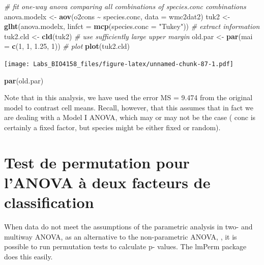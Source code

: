 \documentclass[
  12pt,
]{book}
\newenvironment{Shaded}{\begin{snugshade}}{\end{snugshade}}
\newcommand{\CommentTok}[1]{\textcolor[rgb]{0.56,0.35,0.01}{\textit{#1}}}
\newcommand{\DataTypeTok}[1]{\textcolor[rgb]{0.13,0.29,0.53}{#1}}
\newcommand{\DecValTok}[1]{\textcolor[rgb]{0.00,0.00,0.81}{#1}}
\newcommand{\FloatTok}[1]{\textcolor[rgb]{0.00,0.00,0.81}{#1}}
\newcommand{\KeywordTok}[1]{\textcolor[rgb]{0.13,0.29,0.53}{\textbf{#1}}}
\newcommand{\NormalTok}[1]{#1}
\newcommand{\OperatorTok}[1]{\textcolor[rgb]{0.81,0.36,0.00}{\textbf{#1}}}
\newcommand{\StringTok}[1]{\textcolor[rgb]{0.31,0.60,0.02}{#1}}
\begin{document}
\begin{Shaded}
\begin{Highlighting}[]
\CommentTok{\# fit one{-}way anova comparing all combinations of species.conc combinations}
\NormalTok{anova.modelx \textless{}{-}}\StringTok{ }\KeywordTok{aov}\NormalTok{(o2cons }\OperatorTok{\textasciitilde{}}\StringTok{ }\NormalTok{species.conc, }\DataTypeTok{data =}\NormalTok{ wmc2dat2)}
\NormalTok{tuk2 \textless{}{-}}\StringTok{ }\KeywordTok{glht}\NormalTok{(anova.modelx, }\DataTypeTok{linfct =} \KeywordTok{mcp}\NormalTok{(}\DataTypeTok{species.conc =} \StringTok{"Tukey"}\NormalTok{))}
\CommentTok{\# extract information}
\NormalTok{tuk2.cld \textless{}{-}}\StringTok{ }\KeywordTok{cld}\NormalTok{(tuk2)}
\CommentTok{\# use sufficiently large upper margin}
\NormalTok{old.par \textless{}{-}}\StringTok{ }\KeywordTok{par}\NormalTok{(}\DataTypeTok{mai =} \KeywordTok{c}\NormalTok{(}\DecValTok{1}\NormalTok{, }\DecValTok{1}\NormalTok{, }\FloatTok{1.25}\NormalTok{, }\DecValTok{1}\NormalTok{))}
\CommentTok{\# plot}
\KeywordTok{plot}\NormalTok{(tuk2.cld)}
\end{Highlighting}
\end{Shaded}

\texttt{[image: Labs\_BIO4158\_files/figure-latex/unnamed-chunk-87-1.pdf]}

\begin{Shaded}
\begin{Highlighting}[]
\KeywordTok{par}\NormalTok{(old.par)}
\end{Highlighting}
\end{Shaded}

Note that in this analysis, we have used the error MS = 9.474 from the original model to contrast cell means. Recall, however, that this assumes that in fact we are dealing with a Model I ANOVA, which may or may not be the case ( conc is certainly a fixed factor, but species might be either fixed or random).

\hypertarget{test-de-permutation-pour-lanova-uxe0-deux-facteurs-de-classification}{%
\section{Test de permutation pour l'ANOVA à deux facteurs de classification}\label{test-de-permutation-pour-lanova-uxe0-deux-facteurs-de-classification}}

When data do not meet the assumptions of the parametric analysis in two- and multiway ANOVA, as an alternative to the non-parametric ANOVA, , it is possible to run permutation tests to calculate p- values. The lmPerm package does this easily.
\end{document}
